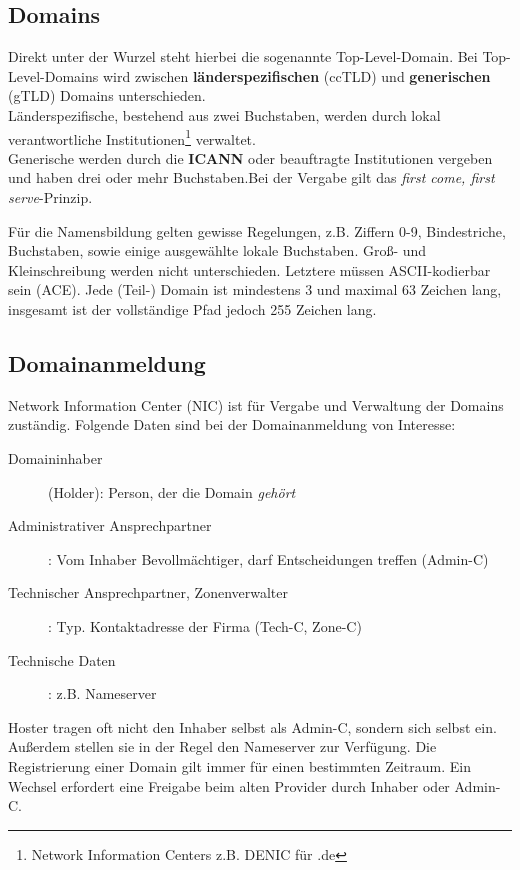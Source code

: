 \documentclass{article} %
\begin{document}
\subsection{Domains}
Direkt unter der Wurzel steht hierbei die sogenannte Top-Level-Domain.
Bei Top-Level-Domains wird zwischen \textbf{länderspezifischen} (ccTLD) und \textbf{generischen} (gTLD) Domains unterschieden.\\
Länderspezifische, bestehend aus zwei Buchstaben, werden durch lokal verantwortliche Institutionen\footnote{Network Information Centers z.B. DENIC für .de} verwaltet.\\
Generische werden durch die \textbf{ICANN} oder beauftragte Institutionen vergeben und haben drei oder mehr Buchstaben.Bei der Vergabe gilt das \emph{first come, first serve}-Prinzip.

Für die Namensbildung gelten gewisse Regelungen, z.B. Ziffern 0-9, Bindestriche, Buchstaben, sowie einige ausgewählte lokale Buchstaben. Groß- und Kleinschreibung werden nicht unterschieden. 
Letztere müssen ASCII-kodierbar sein (ACE)\cite{rfc3490}.
Jede (Teil-) Domain ist mindestens 3 und maximal 63 Zeichen lang, insgesamt ist der vollständige Pfad jedoch 255 Zeichen lang.

\subsection{Domainanmeldung}
Network Information Center (NIC) ist für Vergabe und Verwaltung der Domains zuständig.
Folgende Daten sind bei der Domainanmeldung von Interesse:

\begin{description}
	\item[Domaininhaber](Holder): Person, der die Domain \emph{gehört}
	\item[Administrativer Ansprechpartner]: Vom Inhaber Bevollmächtiger, darf  Entscheidungen treffen (Admin-C)
	\item[Technischer Ansprechpartner, Zonenverwalter]: Typ. Kontaktadresse der Firma (Tech-C, Zone-C)
	\item [Technische Daten]: z.B. Nameserver
\end{description}

Hoster tragen oft nicht den Inhaber selbst als Admin-C, sondern sich selbst ein.
Außerdem stellen sie in der Regel den Nameserver zur Verfügung.
Die Registrierung einer Domain gilt immer für einen bestimmten Zeitraum.
Ein Wechsel erfordert eine Freigabe beim alten Provider durch Inhaber oder Admin-C.\\
\end{document}
